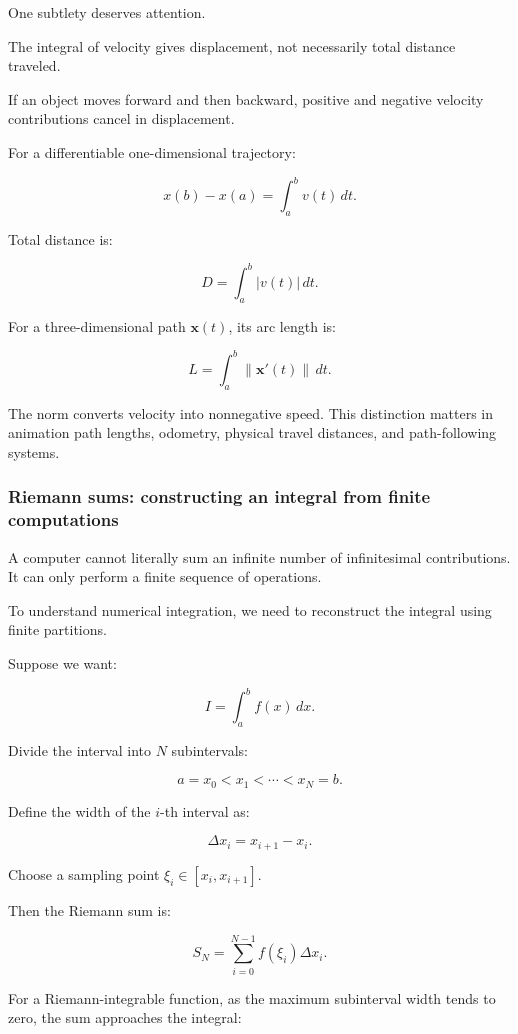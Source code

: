 One subtlety deserves attention.

The integral of velocity gives displacement, not necessarily total distance traveled.

If an object moves forward and then backward, positive and negative velocity contributions cancel in displacement.

For a differentiable one-dimensional trajectory:

\[
x(b)-x(a)=\int_a^b v(t)\,dt.
\]

Total distance is:

\[
\boxed{D=\int_a^b|v(t)|\,dt}.
\]

For a three-dimensional path \(\mathbf x(t)\), its arc length is:

\[
\boxed{ L=\int_a^b\|\mathbf x'(t)\|\,dt }.
\]

The norm converts velocity into nonnegative speed. This distinction matters in animation path lengths, odometry, physical travel distances, and path-following systems.

\subsubsection{Riemann sums: constructing an integral from finite computations}\label{02-foundations-ii-ch022-riemann-sums-constructing-an-integral-from-finite-computations}

A computer cannot literally sum an infinite number of infinitesimal contributions. It can only perform a finite sequence of operations.

To understand numerical integration, we need to reconstruct the integral using finite partitions.

Suppose we want:

\[
I=\int_a^b f(x)\,dx.
\]

Divide the interval into \(N\) subintervals:

\[
a=x_0<x_1<\cdots<x_N=b.
\]

Define the width of the \(i\)-th interval as:

\[
\Delta x_i=x_{i+1}-x_i.
\]

Choose a sampling point \(\xi_i\in[x_i,x_{i+1}]\).

Then the Riemann sum is:

\[
S_N=\sum_{i=0}^{N-1}f(\xi_i)\Delta x_i.
\]

For a Riemann-integrable function, as the maximum subinterval width tends to zero, the sum approaches the integral:

